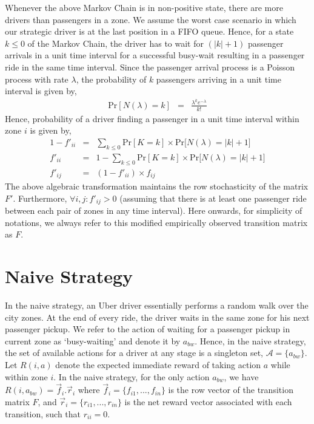 Whenever the above Markov Chain is in non-positive state, there are more drivers than passengers in a zone. We assume the worst case scenario in which our strategic driver is at the last position in a FIFO queue. Hence, for a state $k \leq 0$ of the Markov Chain, the driver has to wait for $(|k| + 1)$ passenger arrivals in a unit time interval for a successful busy-wait resulting in a passenger ride in the same time interval. Since the passenger arrival process is a Poisson process with rate $\lambda$, the probability of $k$ passengers arriving in a unit time interval is given by,
\begin{eqnarray*}
\mathrm{Pr}[N(\lambda) = k] &=& \frac{\lambda^{k}e^{-\lambda}}{k!}
\end{eqnarray*}
Hence, probability of a driver finding a passenger in a unit time interval within zone $i$ is given by,
\begin{eqnarray}
1 - f'_{ii} &=& \sum_{k \leq 0} \mathrm{Pr}[K = k] \times \mathrm{Pr}\big[N(\lambda) = |k| + 1 \big] \nonumber \\
f'_{ii} &=& 1 - \sum_{k \leq 0} \mathrm{Pr}[K = k] \times \mathrm{Pr}\big[N(\lambda) = |k| + 1 \big] \\
f'_{ij} &=& (1 - f'_{ii}) \times f_{ij}
\end{eqnarray}
The above algebraic transformation maintains the row stochasticity of the matrix $F'$. Furthermore, $\forall i,j: f'_{ij} > 0$ (assuming that there is at least one passenger ride between each pair of zones in any time interval). Here onwards, for simplicity of notations, we always refer to this modified empirically observed transition matrix as $F$.

\section{Naive Strategy}

In the naive strategy, an Uber driver essentially performs a random walk over the city zones. At the end of every ride, the driver waits in the same zone for his next passenger pickup. We refer to the action of waiting for a passenger pickup in current zone as `busy-waiting' and denote it by $a_{bw}$. Hence, in the naive strategy, the set of available actions for a driver at any stage is a singleton set, $\mathcal{A} = \{a_{bw}\}$. Let $R(i, a)$ denote the expected immediate reward of taking action $a$ while within zone $i$. In the naive strategy, for the only action $a_{bw}$, we have $R(i,a_{bw}) = \vec{f}_i.\vec{r}_{i}$ where $\vec{f}_i = \{f_{i1}, ..., f_{in}\}$ is the row vector of the transition matrix $F$, and $\vec{r}_{i} = \{r_{i1}, ..., r_{in}\}$ is the net reward vector associated with each transition, such that $r_{ii} = 0$.\\

